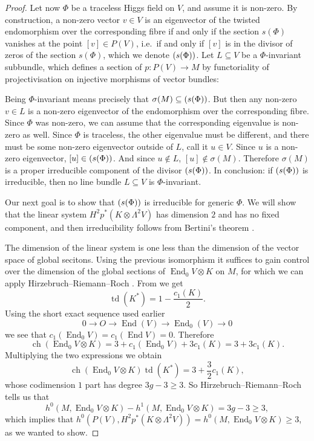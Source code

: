 \documentclass[A4paper, 12pt, british, reqno]{amsart}
\DeclareMathOperator{\End}{End}
\let\div\relax
\DeclareMathOperator{\div}{div}
\newcommand{\ot}{\otimes}
\newcommand{\dual}{^{*}}
\begin{document}
\begin{prop}
\begin{proof}
	Let now $\Phi$ be a traceless Higgs field on $V$, and assume it is non-zero.
	By construction, a non-zero vector $v\in V$ is an eigenvector of the twisted endomorphism over the corresponding fibre if and only if the section $s(\Phi)$ vanishes at the point $[v]\in P(V)$, i.e.~if and only if $[v]$ is in the divisor of zeros of the section $s(\Phi)$, which we denote $\div(s(\Phi))$.
	Let $L\subseteq V$ be a $\Phi$-invariant subbundle, which defines a section of $p\colon P(V)\to M$ by functoriality of projectivisation on injective morphisms of vector bundles:
	\begin{center}
	\end{center}
	Being $\Phi$-invariant means precisely that $\sigma(M)\subseteq \div(s(\Phi))$.
	But then any non-zero $v\in L$ is a non-zero eigenvector of the endomorphism over the corresponding fibre.
	Since $\Phi$ was non-zero, we can assume that the corresponding eigenvalue is non-zero as well.
	Since $\Phi$ is traceless, the other eigenvalue must be different, and there must be some non-zero eigenvector outside of $L$, call it $u\in V$.
	Since $u$ is a non-zero eigenvector, $[u]\in \div(s(\Phi))$.
	And since $u\not\in L$, $[u]\not\in \sigma(M)$.
	Therefore $\sigma(M)$ is a proper irreducible component of the divisor $\div(s(\Phi))$.
	In conclusion: if $\div(s(\Phi))$ is irreducible, then no line bundle $L\subseteq V$ is $\Phi$-invariant.

	Our next goal is to show that $\div(s(\Phi))$ is irreducible for generic $\Phi$.
	We will show that the linear system $H^{2}p^{*}(K\ot\Lambda^{2}V)$ has dimension $2$ and has no fixed component, and then irreducibility follows from Bertini's theorem \cite[Theorem 7.19]{iit82}.

	The dimension of the linear system is one less than the dimension of the vector space of global secitons.
	Using the previous isomorphism it suffices to gain control over the dimension of the global sections of $\End_{0}{V}\ot K$ on $M$, for which we can apply Hirzebruch--Riemann--Roch \cite[Theorem A.4.1]{har77}.
	From \cite[Example A.4.1.1]{har77} we get
	\[ \operatorname{td}(K\dual)=1-\frac{c_{1}(K)}{2}. \]
	Using the short exact sequence used earlier
	\[ 0\to O\to \End(V) \to \End_{0}(V)\to 0 \]
	we see that $c_{1}(\End_{0}{V})=c_{1}(\End{V})=0$.
	Therefore
	\[ \operatorname{ch}(\End_{0}{V}\ot K)=3+c_{1}(\End_{0}{V})+3c_{1}(K)=3+3c_{1}(K). \]
	Multiplying the two expressions we obtain
	\[ \operatorname{ch}(\End_{0}{V}\ot K)\operatorname{td}(K\dual)=3+\frac{3}{2}c_{1}(K), \]
	whose codimension $1$ part has degree $3g-3\geqslant 3$.
	So Hirzebruch--Riemann--Roch tells us that
	\[ h^{0}(M,\End_{0}{V}\ot K)-h^{1}(M,\End_{0}{V}\ot K)=3g-3\geqslant 3, \]
	which implies that $h^{0}(P(V),H^{2}p^{*}(K\ot \Lambda^{2}V))=h^{0}(M,\End_{0}{V}\ot K)\geqslant 3$, as we wanted to show.
    \end{proof}
\end{prop}



\vspace{0.3cm}
\end{document}
